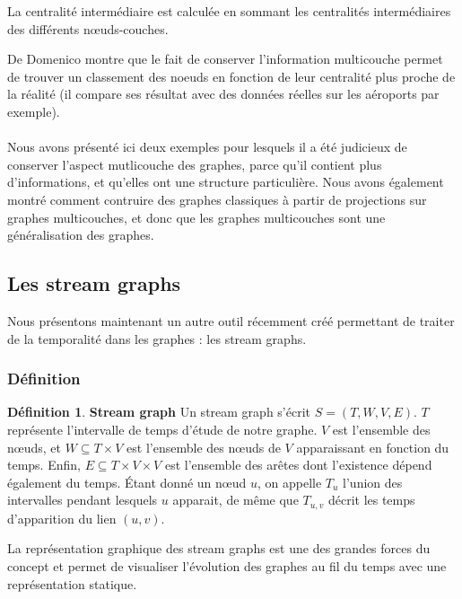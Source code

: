 \documentclass[11pt,a4paper]{article}
\theoremstyle{definition}
\newtheorem{defn}{Définition}
\theoremstyle{remark}
\theoremstyle{remark}
\def \stg {stream graph}
\def \Stg {Stream graph}
\def \stgs {stream graphs}
\begin{document}
La centralité intermédiaire est calculée en sommant les centralités intermédiaires des différents nœuds-couches.

De Domenico montre que le fait de conserver l'information multicouche permet de trouver un classement des noeuds en fonction de leur centralité plus proche de la réalité (il compare ses résultat avec des données réelles sur les aéroports par exemple).

\paragraph{}

Nous avons présenté ici deux exemples pour lesquels il a été judicieux de conserver l'aspect mutlicouche des graphes, parce qu'il contient plus d'informations, et qu'elles ont une structure particulière. Nous avons également montré comment contruire des graphes \og classiques \fg{} à partir de projections sur graphes multicouches, et donc que les graphes multicouches sont une généralisation des graphes.


\subsection{Les \stgs }

Nous présentons maintenant un autre outil récemment créé permettant de traiter de la temporalité dans les graphes : les \stgs .
\subsubsection{Définition}

\begin{defn}{\textbf{\Stg}}
Un \stg{} s'écrit $S=(T,W,V,E)$. $T$ représente l'intervalle de temps d'étude de notre graphe. $V$ est l'ensemble des nœuds, et $W \subseteq T \times V$ est l'ensemble des nœuds de $V$ apparaissant en fonction du temps. Enfin, $E \subseteq T \times V \times V$ est l'ensemble des arêtes dont l'existence dépend également du temps. Étant donné un nœud $u$, on appelle $T_u$ l'union des intervalles pendant lesquels $u$ apparait, de même que $T_{u,v}$ décrit les temps d'apparition du lien $(u,v)$.
\end{defn}

La représentation graphique des \stgs{} est une des grandes forces du concept et permet de visualiser l'évolution des graphes au fil du temps avec une représentation statique.
\end{document}

